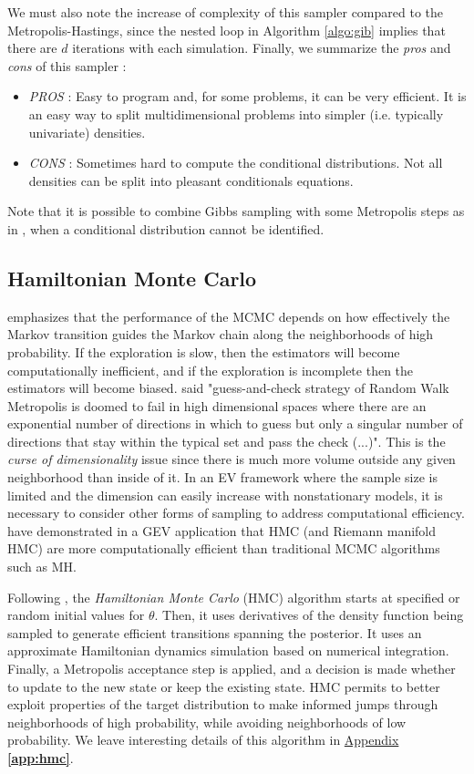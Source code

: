 We must also note the increase of complexity of this sampler compared to the Metropolis-Hastings, since the nested loop in Algorithm \ref{algo:gib} implies that there are $d$ iterations with each simulation. Finally, we summarize the
\emph{pros} and \emph{cons} of this sampler : 

\begin{itemize}
	\item \emph{PROS} : Easy to program and, for some problems, it can be very efficient. It is an easy way to split multidimensional problems into simpler (i.e. typically univariate) densities.
	\item \emph{CONS} : Sometimes hard to compute the conditional distributions. Not all densities can be split into pleasant conditionals equations.
\end{itemize}
Note that it is possible to combine Gibbs sampling with some Metropolis steps as in \cite[chap.11]{Gelman95bayesiandata}, when a conditional distribution cannot be identified.


\subsection{Hamiltonian Monte Carlo}

\citet{betancourt_diagnosing_2016} emphasizes that the performance of the  MCMC depends on  how effectively the Markov transition guides the Markov chain along the neighborhoods of high probability. If the exploration is slow, then the estimators will become computationally inefficient, and if the exploration is incomplete then the estimators will become biased. \citet{betancourt_2017_con} said "guess-and-check strategy of Random Walk Metropolis is doomed to fail in
high dimensional spaces where there are an exponential number of directions
in which to guess but only a singular number of directions that stay within the
typical set and pass the check (...)". This is the \emph{curse of dimensionality} issue since there is much more volume outside any given neighborhood than inside of it.
In an EV framework where the sample size is limited and the dimension can easily increase with nonstationary models, it is necessary to consider other forms of sampling to address computational efficiency. \cite{hartmann_bayesian_2016} have demonstrated in a GEV application that HMC  (and Riemann manifold HMC) are more computationally efficient than traditional MCMC algorithms such as MH. 


Following \citet[chap.32]{stan_development_team_stan_2012}, the \emph{Hamiltonian Monte Carlo} (HMC)
algorithm starts at specified or random initial values for $\theta$. Then, it uses derivatives of the density function being sampled to generate efficient transitions spanning the posterior. It uses an approximate Hamiltonian dynamics simulation based on numerical integration. 
Finally, a Metropolis acceptance step is applied, and a decision is made whether to update to the new state or keep the existing state. 
HMC permits to better exploit properties of
the target distribution to make informed jumps through neighborhoods of high probability, while avoiding neighborhoods of low probability.  We leave interesting details of this algorithm in \hyperref[app:hmc]{Appendix \textbf{\ref{app:hmc}}}.

